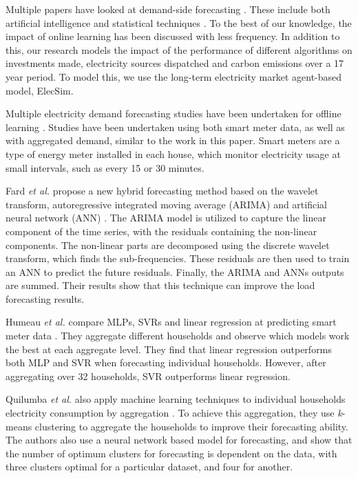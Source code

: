 \documentclass[final,3p,times,twocolumn,numbers]{elsarticle}
\begin{document}
Multiple papers have looked at demand-side forecasting \cite{Singh2012}. These include both artificial intelligence \cite{Kim2000, Tiong2008,Quilumba2014} and statistical techniques \cite{Huang2003,Nguyen2017}. To the best of our knowledge, the impact of online learning has been discussed with less frequency. In addition to this, our research models the impact of the performance of different algorithms on investments made, electricity sources dispatched and carbon emissions over a 17 year period. To model this, we use the long-term electricity market agent-based model, ElecSim.


Multiple electricity demand forecasting studies have been undertaken for offline learning \cite{Chen2004, Gross1987, Ghofrani}. Studies have been undertaken using both smart meter data, as well as with aggregated demand, similar to the work in this paper. Smart meters are a type of energy meter installed in each house, which monitor electricity usage at small intervals, such as every 15 or 30 minutes.


Fard \textit{et al.} propose a new hybrid forecasting method based on the wavelet transform, autoregressive integrated moving average (ARIMA) and artificial neural network (ANN) \cite{Fard2014}. The ARIMA model is utilized to capture the linear component of the time series, with the residuals containing the non-linear components. The non-linear parts are decomposed using the discrete wavelet transform, which finds the sub-frequencies. These residuals are then used to train an ANN  to predict the future residuals. Finally, the ARIMA and ANNs outputs are summed. Their results show that this technique can improve the load forecasting results.	

Humeau \textit{et al.} compare MLPs, SVRs and linear regression at predicting smart meter data \cite{Humeau2013}. They aggregate different households and observe which models work the best at each aggregate level. They find that linear regression outperforms both MLP and SVR when forecasting individual households. However, after aggregating over 32 households, SVR outperforms linear regression.


Quilumba \textit{et al.} also apply machine learning techniques to individual households electricity consumption by aggregation \cite{Fard2014}. To achieve this aggregation, they use \textit{k}-means clustering to aggregate the households to improve their forecasting ability. The authors also use a neural network based model for forecasting, and show that the number of optimum clusters for forecasting is dependent on the data, with three clusters optimal for a particular dataset, and four for another.
\end{document}
